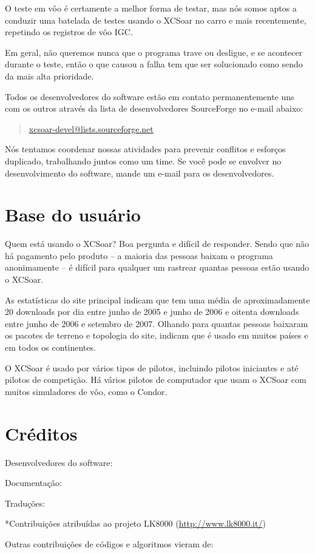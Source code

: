 O teste em vôo é certamente a melhor forma de testar, mas nós somos aptos a conduzir uma batelada de testes usando o XCSoar no carro e mais recentemente, repetindo os registros de vôo IGC.

Em geral, não queremos nunca que o programa trave ou desligue, e se acontecer durante o teste, então o que causou a falha tem que ser solucionado como sendo da mais alta prioridade.

Todos os desenvolvedores do software estão em contato permanentemente uns com os outros através da lista de desenvolvedores SourceForge no e-mail abaixo:

\begin{quote}
\url{xcsoar-devel@lists.sourceforge.net}
\end{quote}
Nós tentamos coordenar nossas atividades para prevenir conflitos e esforços duplicado, trabalhando juntos como um time.  Se você pode se envolver no desenvolvimento do software, mande um e-mail para os desenvolvedores.


\section{Base do usuário}

Quem está usando o XCSoar?  Boa pergunta e difícil de responder.  Sendo que não há pagamento pelo produto – a maioria das pessoas baixam o programa anonimamente – é difícil para qualquer um rastrear quantas pessoas estão usando o XCSoar.  

As estatísticas do site principal indicam que tem uma média de aproximadamente 20 downloads por dia entre junho de 2005 e junho de 2006 e oitenta downloads entre junho de 2006 e setembro de 2007.  Olhando para quantas pessoas baixaram os pacotes de terreno e topologia do site, indicam que é usado em muitos países e em todos os continentes.

O XCSoar é usado por vários tipos de pilotos, incluindo pilotos iniciantes e até pilotos de competição.  Há vários pilotos de computador que usam o XCSoar com muitos simuladores de vôo, como o Condor.



\section{Créditos}\label{sec:credits}

Desenvolvedores do software:
\begin{itemize}
  
\end{itemize}


Documentação:
\begin{itemize}
  
\end{itemize}


Traduções:
\begin{itemize}
  
\end{itemize}
*Contribuições atribuídas ao projeto LK8000 (\url{http://www.lk8000.it/})


Outras contribuições de códigos e algoritmos vieram de:
\begin{description}
  
\end{description}

